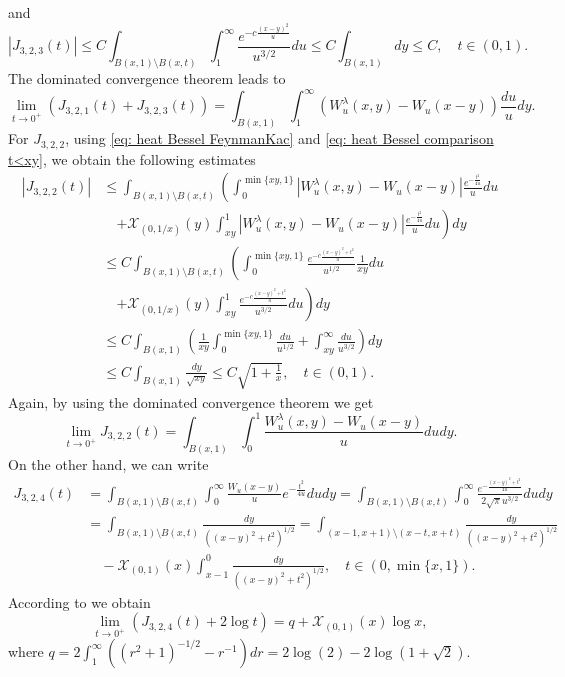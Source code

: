 \documentclass[a4paper,10pt, reqno]{amsart}
\theoremstyle{definition}
\theoremstyle{remark}
\numberwithin{equation}{section}
\begin{document}
and 
\[
|J_{3,2,3}(t)|\leq C\int_{B(x,1)\setminus B(x,t)}\int_1^\infty\frac{e^{-c\frac{(x-y)^2}{u}}}{u^{3/2}}du\leq C\int_{B(x,1)}dy\leq C,\quad t\in (0,1).
\]
The dominated convergence theorem leads to
\[
\lim_{t\rightarrow 0^+}(J_{3,2,1}(t)+J_{3,2,3}(t))=\int_{B(x,1)}\int_1^\infty \left(W_u^\lambda (x,y)-W_u(x-y)\right)\frac{du}{u}dy.
\]
For $J_{3,2,2}$, using \eqref{eq: heat Bessel FeynmanKac} and \eqref{eq: heat Bessel comparison t<xy}, we obtain the following estimates
\begin{align*}
    |J_{3,2,2}(t)|&\leq \int_{B(x,1)\setminus B(x,t)}\left(\int_0^{\min \{xy,1\}}|W_u^\lambda (x,y)-W_u(x-y)|\frac{e^{-\frac{t^2}{4u}}}{u}du\right.\\
    &\quad \left.+\mathcal X_{(0,1/x)}(y)\int_{xy}^1|W_u^\lambda (x,y)-W_u(x-y)|\frac{e^{-\frac{t^2}{4u}}}{u}du\right)dy\\
    &\leq C\int_{B(x,1)\setminus B(x,t)}\left(\int_0^{\min \{xy,1\}}\frac{e^{-c\frac{(x-y)^2+t^2}{u}}}{u^{1/2}}\frac{1}{xy}du\right.\\
    &\quad \left.+\mathcal X_{(0,1/x)}(y)\int_{xy}^1\frac{e^{-c\frac{(x-y)^2+t^2}{u}}}{u^{3/2}}du\right)dy\\
    &\leq C\int_{B(x,1)}\left(\frac{1}{xy}\int_0^{\min \{xy,1\}}\frac{du}{u^{1/2}}+\int_{xy}^\infty \frac{du}{u^{3/2}}\right)dy\\
    &\leq C\int_{B(x,1)}\frac{dy}{\sqrt{xy}}\leq C \sqrt{1+\frac{1}{x}},\quad t\in (0,1).
\end{align*}
Again, by using the dominated convergence theorem we get
\[
\lim_{t\rightarrow 0^+}J_{3,2,2}(t)=\int_{B(x,1)}\int_0^1\frac{W_u^\lambda (x,y)-W_u(x-y)}{u}dudy.
\]
On the other hand, we can write
\begin{align*}
    J_{3,2,4}(t)&=\int_{B(x,1)\setminus B(x,t)}\int_0^\infty \frac{W_u(x-y)}{u}e^{-\frac{t^2}{4u}}dudy=\int_{B(x,1)\setminus B(x,t)}\int_0^\infty \frac{e^{-\frac{(x-y)^2+t^2}{4u}}}{2\sqrt{\pi}u^{3/2}}dudy\\
    &=\int_{B(x,1)\setminus B(x,t)}\frac{dy}{((x-y)^2+t^2)^{1/2}}=\int_{(x-1,x+1)\setminus (x-t,x+t)}\frac{dy}{((x-y)^2+t^2)^{1/2}}\\
    &\quad -\mathcal X_{(0,1)}(x)\int_{x-1}^0\frac{dy}{((x-y)^2+t^2)^{1/2}},\quad t\in (0,\min\{x,1\}).
\end{align*}
According to \cite[Lemma 4.1]{ChHW} we obtain 
\[
\lim_{t\rightarrow 0^+}(J_{3,2,4}(t)+2\log t)=q+\mathcal X_{(0,1)}(x)\log x,
\]
where $q=2\int_1^\infty \left((r^2+1)^{-1/2}-r^{-1}\right)dr=2\log(2)-2\log(1+\sqrt{2})$. 
\end{document}
